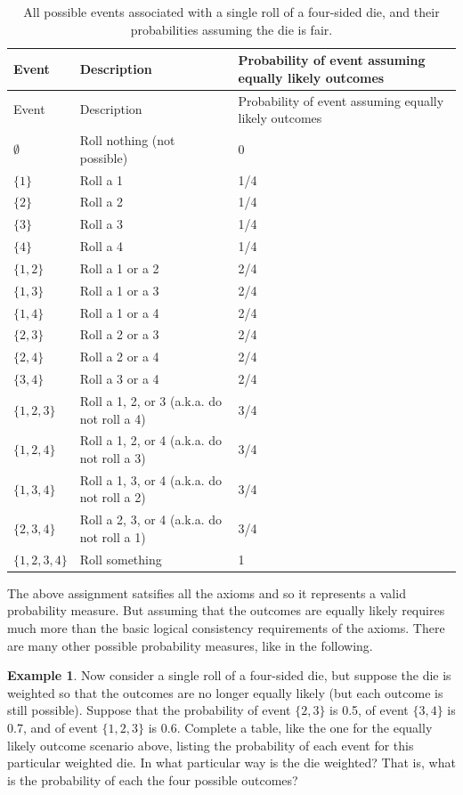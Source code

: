 \documentclass[
]{book}
\theoremstyle{definition}
\theoremstyle{definition}
\newtheorem{example}{Example}[chapter]
\theoremstyle{definition}
\theoremstyle{remark}
\begin{document}
\begin{longtable}[]{@{}lll@{}}
\caption{\label{tab:die-events-fair} All possible events associated with a single roll of a four-sided die, and their probabilities assuming the die is fair.}\tabularnewline
\toprule
Event & Description & Probability of event assuming equally likely outcomes\tabularnewline
\midrule
\endfirsthead
\toprule
Event & Description & Probability of event assuming equally likely outcomes\tabularnewline
\midrule
\endhead
\(\emptyset\) & Roll nothing (not possible) & 0\tabularnewline
\(\{1\}\) & Roll a 1 & 1/4\tabularnewline
\(\{2\}\) & Roll a 2 & 1/4\tabularnewline
\(\{3\}\) & Roll a 3 & 1/4\tabularnewline
\(\{4\}\) & Roll a 4 & 1/4\tabularnewline
\(\{1, 2\}\) & Roll a 1 or a 2 & 2/4\tabularnewline
\(\{1, 3\}\) & Roll a 1 or a 3 & 2/4\tabularnewline
\(\{1, 4\}\) & Roll a 1 or a 4 & 2/4\tabularnewline
\(\{2, 3\}\) & Roll a 2 or a 3 & 2/4\tabularnewline
\(\{2, 4\}\) & Roll a 2 or a 4 & 2/4\tabularnewline
\(\{3, 4\}\) & Roll a 3 or a 4 & 2/4\tabularnewline
\(\{1, 2, 3\}\) & Roll a 1, 2, or 3 (a.k.a. do not roll a 4) & 3/4\tabularnewline
\(\{1, 2, 4\}\) & Roll a 1, 2, or 4 (a.k.a. do not roll a 3) & 3/4\tabularnewline
\(\{1, 3, 4\}\) & Roll a 1, 3, or 4 (a.k.a. do not roll a 2) & 3/4\tabularnewline
\(\{2, 3, 4\}\) & Roll a 2, 3, or 4 (a.k.a. do not roll a 1) & 3/4\tabularnewline
\(\{1, 2, 3, 4\}\) & Roll something & 1\tabularnewline
\bottomrule
\end{longtable}

The above assignment satsifies all the axioms and so it represents a valid probability measure. But assuming that the outcomes are equally likely requires much more than the basic logical consistency requirements of the axioms. There are many other possible probability measures, like in the following.

\begin{example}
\protect\hypertarget{exm:die-weighted}{}{\label{exm:die-weighted} }Now consider a single roll of a four-sided die, but suppose the die is weighted so that the outcomes are no longer equally likely (but each outcome is still possible). Suppose that the probability of event \(\{2, 3\}\) is 0.5, of event \(\{3, 4\}\) is 0.7, and of event \(\{1, 2, 3\}\) is 0.6. Complete a table, like the one for the equally likely outcome scenario above, listing the probability of each event for this particular weighted die. In what particular way is the die weighted? That is, what is the probability of each the four possible outcomes?
\end{example}
\end{document}
